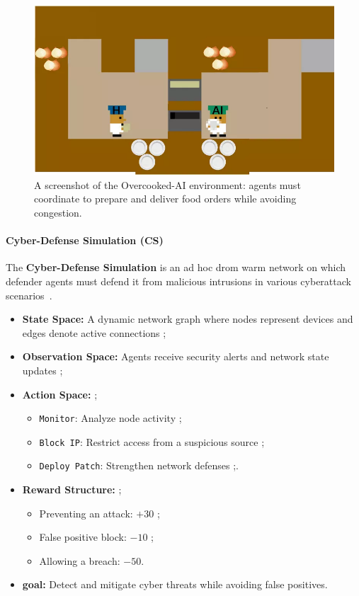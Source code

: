 \documentclass[pdflatex,sn-mathphys-num]{sn-jnl}%
\theoremstyle{thmstyleone}%
\theoremstyle{thmstyletwo}%
\theoremstyle{thmstylethree}%
\begin{document}
\begin{figure}[h!]
    \centering
    \includegraphics[width=0.7\linewidth]{figures/overcooked.png}
    \caption{A screenshot of the Overcooked-AI environment: agents must coordinate to prepare and deliver food orders while avoiding congestion.}
    \label{fig:overcooked}
\end{figure}

\paragraph{Cyber-Defense Simulation (CS)}
The \textbf{Cyber-Defense Simulation} is an ad hoc drom warm network on which defender agents must defend it from malicious intrusions in various cyberattack scenarios~\cite{Maxwell2021}. 

\begin{itemize}
    \item \textbf{State Space:} A dynamic network graph where nodes represent devices and edges denote active connections ;
    \item \textbf{Observation Space:} Agents receive security alerts and network state updates ;
    \item \textbf{Action Space:}  ;
          \begin{itemize}
              \item \texttt{Monitor}: Analyze node activity ;
              \item \texttt{Block IP}: Restrict access from a suspicious source ;
              \item \texttt{Deploy Patch}: Strengthen network defenses ;.
          \end{itemize}
    \item \textbf{Reward Structure:} ;
          \begin{itemize}
              \item Preventing an attack: $+30$ ;
              \item False positive block: $-10$ ;
              \item Allowing a breach: $-50$.
          \end{itemize}
    \item \textbf{goal:} Detect and mitigate cyber threats while avoiding false positives.
\end{itemize}
\end{document}
